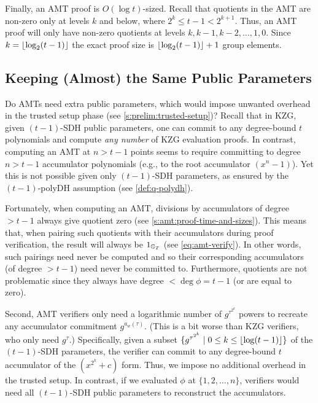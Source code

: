 Finally, an AMT proof is $O(\log{t})$-sized.
Recall that quotients in the AMT are non-zero only at levels $k$ and below, where $2^k \le t-1 < 2^{k+1}$.
Thus, an AMT proof will only have non-zero quotients at levels $k, k-1, k-2, \dots, 1, 0$.
Since $k = \lfloor\log_2(t-1)\rfloor$ the exact proof size is $\lfloor\log_2(t-1)\rfloor+1$ group elements.


\subsection{Keeping (Almost) the Same Public Parameters}
\label{s:amt:public-parameters}
Do AMTs need extra public parameters, which would impose unwanted overhead in the trusted setup phase (see \cref{s:prelim:trusted-setup})?
Recall that in KZG, given $(t-1)$-SDH public parameters, one can commit to any degree-bound $t$ polynomials and compute \textit{any number} of KZG evaluation proofs.
In contrast, computing an AMT at $n > t-1$ points seems to require committing to degree $n > t-1$ accumulator polynomials (e.g., to the root accumulator $(x^n-1)$).
Yet this is not possible given only $(t-1)$-SDH parameters, as ensured by the $(t-1)$-polyDH assumption (see \cref{def:q-polydh}).

Fortunately, when computing an AMT, divisions by accumulators of degree $> t-1$ always give quotient zero (see \cref{s:amt:proof-time-and-sizes}).
This means that, when pairing such quotients with their accumulators during proof verification, the result will always be $1_{\mathbb{G}_T}$ (see \cref{eq:amt-verify}).
In other words, such pairings need never be computed and so their corresponding accumulators (of degree $>t-1$) need never be committed to.
Furthermore, quotients are not problematic since they always have degree $< \deg{\phi} = t-1$ (or are equal to zero).

Second, AMT verifiers only need a logarithmic number of $g^{\tau^{2^k}}$ powers to recreate any accumulator commitment $g^{a_w(\tau)}$.
(This is a bit worse than KZG verifiers, who only need $g^\tau$.)
Specifically, given a subset $\{g^{\tau^{2^k}} \mathrel| 0 \le k\le \lfloor\log(t-1)\rfloor\}$ of the $(t-1)$-SDH parameters, the verifier can commit to any degree-bound $t$ accumulator of the $(x^{2^k}+c)$ form.
Thus, we impose no additional overhead in the trusted setup.
In contrast, if we evaluated $\phi$ at $\{1,2,\dots, n\}$, verifiers would need all $(t-1)$-SDH public parameters to reconstruct the accumulators.